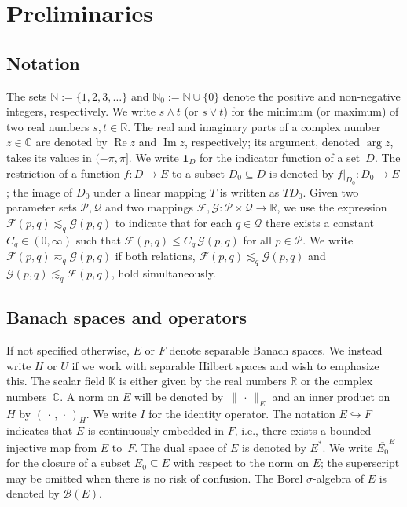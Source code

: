 \documentclass[reqno]{amsart}
\numberwithin{equation}{section}
\newcommand{\R}{\mathbb{R}}
\newcommand{\C}{\mathbb{C}}
\newcommand{\N}{\mathbb{N}}
\newcommand{\K}{\mathbb{K}}
\newcommand{\norm}[2]{     \| #1       \|_{ #2 }}
\newcommand{\scalar}[2]{     ( #1       )_{ #2 }}
\renewcommand{\Re}{\operatorname{Re}}
\renewcommand{\Im}{\operatorname{Im}}
\newcommand{\from}{\colon}
\newcommand{\dual}[1]{#1^*}
\theoremstyle{remark}
\theoremstyle{definition}
\begin{document}
\section{Preliminaries}\label{sec:prelims}

\subsection{Notation} 

The sets $\N := \{1,2,3,\dots\}$ and $\N_0 := \N \cup \{0\}$ 
denote the positive and non-negative integers, 
respectively. 
We write $s\wedge t$ (or $s \vee t$) for the 
minimum (or maximum)  
of two real numbers $s,t\in\R$. 
The real and imaginary parts of 
a complex number $z \in \C$ 
are denoted by $\Re z$ and $\Im z$, respectively; 
its argument, denoted $\arg z$, 
takes its values in $(-\pi,\pi]$. 
We write $\mathbf 1_D$ for the indicator function 
of a set~$D$. 
%
The restriction of 
a function $f \colon D \to E$ to 
a subset $D_0 \subseteq D$ 
is denoted by $f|_{D_0}\from D_0 \to E$;  
the image of $D_0$ under a linear mapping $T$ 
is written as $T D_0$. 
%
Given two parameter sets  
$\mathscr{P},\mathscr{Q}$ 
and two mappings 
$\mathscr{F},\mathscr{G}\from \mathscr{P}\times\mathscr{Q}\to\R$, 
we use the expression 
$\mathscr{F} (p,q) \lesssim_{q} \mathscr{G} (p,q)$ 
to indicate that for each $q \in \mathscr{Q}$ 
there exists a constant ${C_q \in(0,\infty)}$ 
such that 
$\mathscr{F} (p,q) \leq C_q \, \mathscr{G} (p,q)$ 
for all ${p\in \mathscr{P}}$. 
We write $\mathscr{F} (p,q) \eqsim_q \mathscr{G} (p,q)$ 
if both relations, 
$\mathscr{F} (p,q) \lesssim_q \mathscr{G}(p,q)$ 
and $\mathscr{G} (p,q) \lesssim_q \mathscr{F}(p,q)$, 
hold simultaneously. 


\subsection{Banach spaces and operators} 

If not specified otherwise, 
$E$ or $F$ denote separable Banach spaces. 
We instead write $H$ or $U$ 
if we work with separable Hilbert spaces 
and wish to emphasize this. 
The scalar field $\K$ is either given 
by the real numbers $\R$ 
or the complex numbers~$\C$. 
A norm on $E$ will be denoted  
by~$\norm{\,\cdot\,}{E}$ 
and an inner product on $H$ 
by $\scalar{\,\cdot\,, \,\cdot\,}{H}$. 
We write $I$ for the identity operator. 
The notation ${E \hookrightarrow F}$ 
indicates that $E$ is continuously embedded in $F$, 
i.e., there exists a bounded injective map from $E$ to~$F$. 
The dual space of $E$ is denoted by $\dual E$\!. 
We write $\overline{E_0}^E$ for the closure 
of a subset $E_0\subseteq E$ 
with respect to the norm on $E$; 
the superscript may be omitted 
when there is no risk of confusion. 
The Borel $\sigma$-algebra of $E$ 
is denoted by $\mathcal B(E)$.
\end{document}
